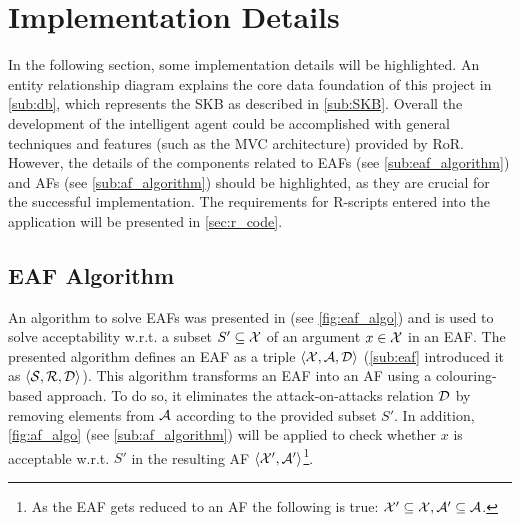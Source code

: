 \section{Implementation Details}
\label{sec:implementation}
In the following section, some implementation details will be highlighted. An entity relationship diagram explains the core data foundation of this project in \autoref{sub:db}, which represents the \gls{SKB} as described in \autoref{sub:SKB}. Overall the development of the intelligent agent could be accomplished with general techniques and features (such as the \gls{MVC} architecture) provided by \gls{RoR}. However, the details of the components related to \glspl{EAF} (see \autoref{sub:eaf_algorithm}) and \glspl{AF} (see \autoref{sub:af_algorithm}) should be highlighted, as they are crucial for the successful implementation. The requirements for \gls{R}-scripts entered into the application will be presented in \autoref{sec:r_code}.
	




\subsection{\Gls{EAF} Algorithm}
\label{sub:eaf_algorithm}

An algorithm to solve \glspl{EAF} was presented in \cite{Dunne10computationin} (see \cref{fig:eaf_algo}) and is used to solve acceptability \gls{w.r.t.} a subset $S' \subseteq \mathcal{X}$ of an argument $x \in \mathcal{X}$ in an \gls{EAF}. The presented algorithm defines an \gls{EAF} as a triple $\langle \mathcal{X}, \mathcal{A}, \mathcal{D} \rangle$ (\autoref{sub:eaf} introduced it as $\langle \mathcal{S}, \mathcal{R}, \mathcal{D} \rangle$).
This algorithm transforms an \gls{EAF} into an \gls{AF} using a colouring-based approach. To do so, it eliminates the attack-on-attacks relation $\mathcal{D}$ by removing elements from $\mathcal{A}$ according to the provided subset $S'$. In addition, \cref{fig:af_algo} (see \cref{sub:af_algorithm}) will be applied to check whether $x$ is acceptable \gls{w.r.t.} $S'$ in the resulting AF $\langle \mathcal{X}', \mathcal{A}' \rangle$\footnote{As the \gls{EAF} gets reduced to an \gls{AF} the following is true: $\mathcal{X}' \subseteq \mathcal{X}, \mathcal{A}' \subseteq \mathcal{A}$.}.


